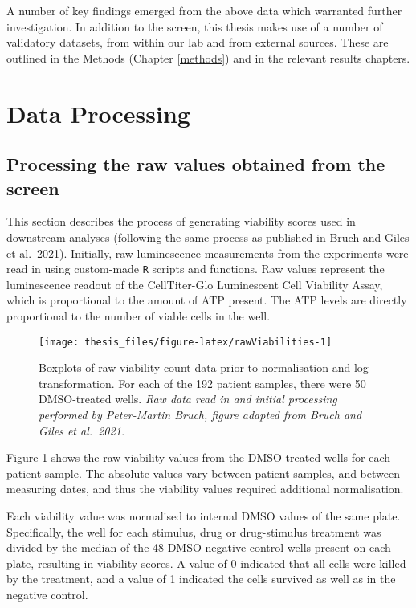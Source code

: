 \documentclass[11pt, a4paper, twosided]{book}
\begin{document}
A number of key findings emerged from the above data which warranted further investigation. In addition to the screen, this thesis makes use of a number of validatory datasets, from within our lab and from external sources. These are outlined in the Methods (Chapter \ref{methods}) and in the relevant results chapters.

\hypertarget{data-processing}{%
\section{Data Processing}\label{data-processing}}

\hypertarget{processing-the-raw-values-obtained-from-the-screen}{%
\subsection{Processing the raw values obtained from the screen}\label{processing-the-raw-values-obtained-from-the-screen}}

This section describes the process of generating viability scores used in downstream analyses (following the same process as published in Bruch and Giles et al.~2021). Initially, raw luminescence measurements from the experiments were read in using custom-made \texttt{R} scripts and functions. Raw values represent the luminescence readout of the CellTiter-Glo Luminescent Cell Viability Assay, which is proportional to the amount of ATP present. The ATP levels are directly proportional to the number of viable cells in the well.


\begin{figure}

{\centering \texttt{[image: thesis\_files/figure-latex/rawViabilities-1]} 

}

\caption{Boxplots of raw viability count data prior to normalisation and log transformation. For each of the 192 patient samples, there were 50 DMSO-treated wells. \emph{Raw data read in and initial processing performed by Peter-Martin Bruch, figure adapted from Bruch and Giles et al.~2021.}}\label{fig:rawViabilities}
\end{figure}
Figure \ref{fig:rawViabilities} shows the raw viability values from the DMSO-treated wells for each patient sample. The absolute values vary between patient samples, and between measuring dates, and thus the viability values required additional normalisation.

Each viability value was normalised to internal DMSO values of the same plate. Specifically, the well for each stimulus, drug or drug-stimulus treatment was divided by the median of the 48 DMSO negative control wells present on each plate, resulting in viability scores. A value of 0 indicated that all cells were killed by the treatment, and a value of 1 indicated the cells survived as well as in the negative control.
\end{document}
